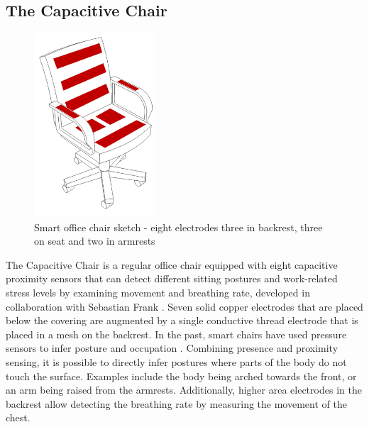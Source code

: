 \subsection{The Capacitive Chair}
\label{ch:prot_capchair}
\begin{figure}[h]
\centering
\includegraphics[width=0.4\textwidth]{images/smartofficechair}
\caption{Smart office chair sketch - eight electrodes three in backrest, three on seat and two in armrests}
\label{fig:smartchair_sketch}
\end{figure}
The Capacitive Chair is a regular office chair equipped with eight capacitive proximity sensors that can detect different sitting postures and work-related stress levels by examining movement and breathing rate, developed in collaboration with Sebastian Frank \cite{Braun2013ChairAid}. Seven solid copper electrodes that are placed below the covering are augmented by a single conductive thread electrode that is placed in a mesh on the backrest. In the past, smart chairs have used pressure sensors to infer posture and occupation \cite{tan2001sensing}. Combining presence and proximity sensing, it is possible to directly infer postures where parts of the body do not touch the surface. Examples include the body being arched towards the front, or an arm being raised from the armrests. Additionally, higher area electrodes in the backrest allow detecting the breathing rate by measuring the movement of the chest.

